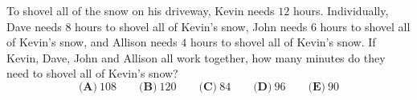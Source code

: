 To shovel all of the snow on his driveway, Kevin needs $12$ hours. Individually, Dave needs $8$ hours to shovel all of Kevin's snow, John needs $6$ hours to shovel all of Kevin's snow, and Allison needs $4$ hours to shovel all of Kevin's snow. If Kevin, Dave, John and Allison all work together, how many minutes do they need to shovel all of Kevin's snow?
\[\textbf{(A)}\ 108\qquad\textbf{(B)}\ 120\qquad\textbf{(C)}\ 84\qquad\textbf{(D)}\ 96\qquad\textbf{(E)}\ 90\]
